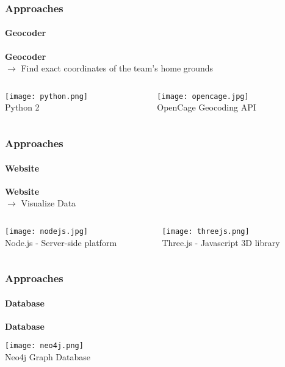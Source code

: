 \documentclass{beamer}
\begin{document}
	 \begin{frame}
    \frametitle{Approaches}
		\framesubtitle{Geocoder}
		\textbf{Geocoder} \\
		$\rightarrow$ Find exact coordinates of the team's home grounds
    \begin{columns}[T] %
     \begin{column}[T]{5cm} %
			\begin{center}
     \texttt{[image: python.png]}\\
			Python 2
			\end{center}
     \end{column}
     \begin{column}[T]{5cm} %
		\begin{center}
		 \texttt{[image: opencage.jpg]} \\
			OpenCage Geocoding API
			\end{center}
     \end{column}
     \end{columns}
  \end{frame}
	
	 \begin{frame}
    \frametitle{Approaches}
		\framesubtitle{Website}
		\textbf{Website} \\
		$\rightarrow$ Visualize Data
    \begin{columns}[T] %
     \begin{column}[T]{5cm} %
			\begin{center}
     \texttt{[image: nodejs.jpg]}\\
			Node.js - Server-side platform
			\end{center}
     \end{column}
     \begin{column}[T]{5cm} %
		\begin{center}
		 \texttt{[image: threejs.png]} \\
			Three.js - Javascript 3D library
			\end{center}
     \end{column}
     \end{columns}
  \end{frame}
	
	\begin{frame}
		\frametitle{Approaches}
		\framesubtitle{Database}
		\textbf{Database} \\ 
			\begin{center}
      \texttt{[image: neo4j.png]}\\
			Neo4j Graph Database
			\end{center}
  \end{frame}
	
\end{document}

